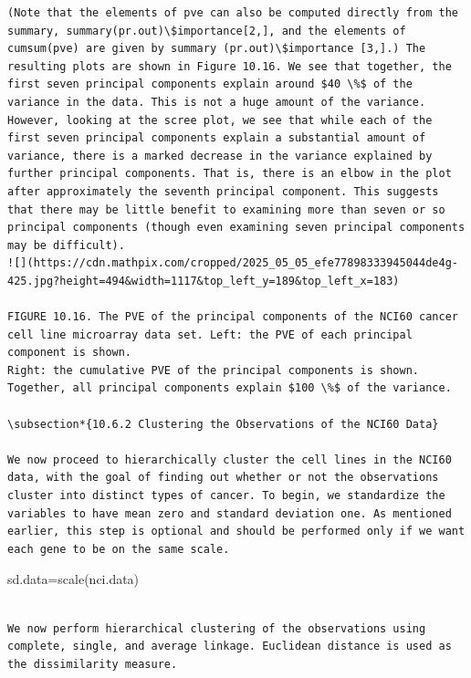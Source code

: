 \documentclass[10pt]{article}
\begin{document}
\begin{verbatim}
(Note that the elements of pve can also be computed directly from the summary, summary(pr.out)\$importance[2,], and the elements of cumsum(pve) are given by summary (pr.out)\$importance [3,].) The resulting plots are shown in Figure 10.16. We see that together, the first seven principal components explain around $40 \%$ of the variance in the data. This is not a huge amount of the variance. However, looking at the scree plot, we see that while each of the first seven principal components explain a substantial amount of variance, there is a marked decrease in the variance explained by further principal components. That is, there is an elbow in the plot after approximately the seventh principal component. This suggests that there may be little benefit to examining more than seven or so principal components (though even examining seven principal components may be difficult).
![](https://cdn.mathpix.com/cropped/2025_05_05_efe77898333945044de4g-425.jpg?height=494&width=1117&top_left_y=189&top_left_x=183)

FIGURE 10.16. The PVE of the principal components of the NCI60 cancer cell line microarray data set. Left: the PVE of each principal component is shown.
Right: the cumulative PVE of the principal components is shown. Together, all principal components explain $100 \%$ of the variance.

\subsection*{10.6.2 Clustering the Observations of the NCI60 Data}

We now proceed to hierarchically cluster the cell lines in the NCI60 data, with the goal of finding out whether or not the observations cluster into distinct types of cancer. To begin, we standardize the variables to have mean zero and standard deviation one. As mentioned earlier, this step is optional and should be performed only if we want each gene to be on the same scale.
\end{verbatim}

\begin{displayquote}
sd.data=scale(nci.data)
\end{displayquote}

\begin{verbatim}

We now perform hierarchical clustering of the observations using complete, single, and average linkage. Euclidean distance is used as the dissimilarity measure.
\end{verbatim}
\end{document}
